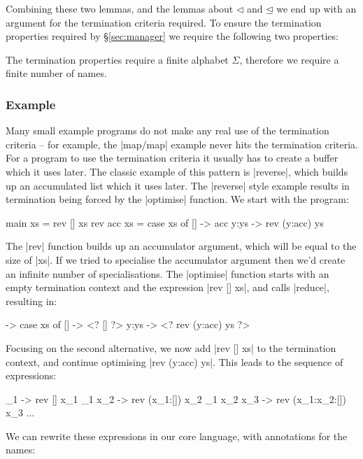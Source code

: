 \documentclass[draft]{sigplanconf}
\begin{document}
Combining these two lemmas, and the lemmas about $\lhd$ and $\unlhd$ we end up with an argument for the termination criteria required. To ensure the termination properties required by \S\ref{sec:manager} we require the following two properties:



The termination properties require a finite alphabet $\Sigma$, therefore we require a finite number of names. 


\subsubsection{Example}

Many small example programs do not make any real use of the termination criteria -- for example, the |map/map| example never hits the termination criteria. For a program to use the termination criteria it usually has to create a buffer which it uses later. The classic example of this pattern is |reverse|, which builds up an accumulated list which it uses later. The |reverse| style example results in termination being forced by the |optimise| function. We start with the program:

\begin{code}
main xs = rev [] xs
rev acc xs = case  xs of
                   []    -> acc
                   y:ys  -> rev (y:acc) ys
\end{code}

The |rev| function builds up an accumulator argument, which will be equal to the size of |xs|. If we tried to specialise the accumulator argument then we'd create an infinite number of specialisations. The |optimise| function starts with an empty termination context and the expression |rev [] xs|, and calls |reduce|, resulting in:

\begin{code}
\xs -> case  xs of
             []    -> <? [] ?>
             y:ys  -> <? rev (y:acc) ys ?>
\end{code}

Focusing on the second alternative, we now add |rev [] xs| to the termination context, and continue optimising |rev (y:acc) ys|. This leads to the sequence of expressions:

\begin{code}
\x_1 -> rev [] x_1
\x_1 x_2 -> rev (x_1:[]) x_2
\x_1 x_2 x_3 -> rev (x_1:x_2:[]) x_3
...
\end{code}

We can rewrite these expressions in our core language, with annotations for the names:
\end{document}
